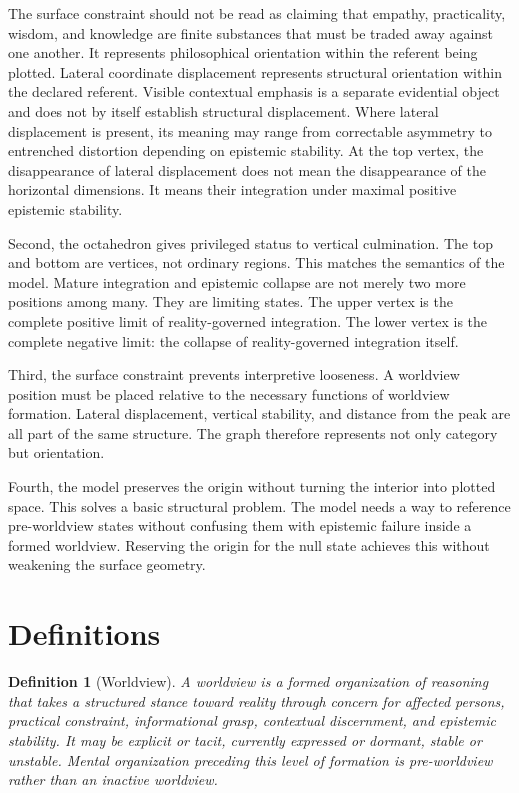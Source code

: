 \documentclass[11pt]{article}
\newtheorem{definition}{Definition}
\begin{document}
The surface constraint should not be read as claiming that empathy, practicality, wisdom, and knowledge are finite substances that must be traded away against one another. It represents philosophical orientation within the referent being plotted. Lateral coordinate displacement represents structural orientation within the declared referent. Visible contextual emphasis is a separate evidential object and does not by itself establish structural displacement. Where lateral displacement is present, its meaning may range from correctable asymmetry to entrenched distortion depending on epistemic stability. At the top vertex, the disappearance of lateral displacement does not mean the disappearance of the horizontal dimensions. It means their integration under maximal positive epistemic stability.

Second, the octahedron gives privileged status to vertical culmination. The top and bottom are vertices, not ordinary regions. This matches the semantics of the model. Mature integration and epistemic collapse are not merely two more positions among many. They are limiting states. The upper vertex is the complete positive limit of reality-governed integration. The lower vertex is the complete negative limit: the collapse of reality-governed integration itself.

Third, the surface constraint prevents interpretive looseness. A worldview position must be placed relative to the necessary functions of worldview formation. Lateral displacement, vertical stability, and distance from the peak are all part of the same structure. The graph therefore represents not only category but orientation.

Fourth, the model preserves the origin without turning the interior into plotted space. This solves a basic structural problem. The model needs a way to reference pre-worldview states without confusing them with epistemic failure inside a formed worldview. Reserving the origin for the null state achieves this without weakening the surface geometry.

\section{Definitions}

\begin{definition}[Worldview]
A worldview is a formed organization of reasoning that takes a structured stance toward reality through concern for affected persons, practical constraint, informational grasp, contextual discernment, and epistemic stability. It may be explicit or tacit, currently expressed or dormant, stable or unstable. Mental organization preceding this level of formation is pre-worldview rather than an inactive worldview.
\end{definition}
\end{document}
